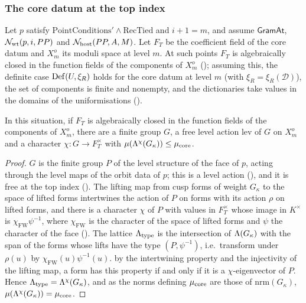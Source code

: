 \subsubsection*{The core datum at the top index}

Let $p$ satisfy $\mathrm{PointConditions}'\wedge\mathrm{RecTied}$ and $i+1=m$, and assume
$\mathsf{GramAt}$, $\mathcal N_{\mathrm{wt}}(p,i,PP)$ and $\mathcal N_{\mathrm{host}}(PP,A,M)$. Let $F_T$ be the coefficient
field of the core datum and $X^o_m$ its moduli space at level $m$. At such points $F_T$ is
algebraically closed in the function fields of the components of $X^o_m$
(); assuming this, the definite case
$\mathrm{Def}(U,\xi_R)$ holds for the core datum at level $m$ (with $\xi_R=\xi_R(\mathcal D)$), the
set of components is finite and nonempty, and the dictionaries take values in the domains of the
uniformisations ().

\begin{proposition}\label{pf:lift1:eigcore}
In this situation, if $F_T$ is algebraically closed in the function fields of the components of
$X^o_m$, there are a finite group $G$, a free level action $\mathrm{lev}$ of $G$ on $X^o_m$ and a
character $\chi\colon G\to F_T^\times$ with $\mu(\Lambda^{\chi}(G_\kappa))\le\mu_{\mathrm{core}}$.
\end{proposition}

\begin{proof}
$G$ is the finite group $P$ of the level structure of the face of $p$, acting through the level maps of
the orbit data of $p$; this is a level action (), and it is
free at the top index (). The lifting map from
cusp forms of weight $G_\kappa$ to the space of lifted forms intertwines the action of $P$ on forms with
its action $\rho$ on lifted forms, and there is a character $\chi$ of $P$ with values in $F_T^\times$
whose image in $K^\times$ is $\chi_{\mathrm{FW}}\psi^{-1}$, where $\chi_{\mathrm{FW}}$ is the character of
the space of lifted forms and $\psi$ the character of the face
(). The lattice
$\Lambda_{\mathrm{type}}$ is the intersection of $\Lambda(G_\kappa)$ with the span of the forms
whose lifts have the type $(P,\psi^{-1})$, i.e.\ transform under $\rho(u)$ by
$\chi_{\mathrm{FW}}(u)\psi^{-1}(u)$. by the intertwining property and the injectivity of the lifting
map, a form has this property if and only if it is a $\chi$-eigenvector of $P$. Hence
$\Lambda_{\mathrm{type}}=\Lambda^{\chi}(G_\kappa)$, and as the norms defining $\mu_{\mathrm{core}}$ are those
of $\mathrm{nrm}(G_\kappa)$, $\mu(\Lambda^{\chi}(G_\kappa))=\mu_{\mathrm{core}}$.
\end{proof}

